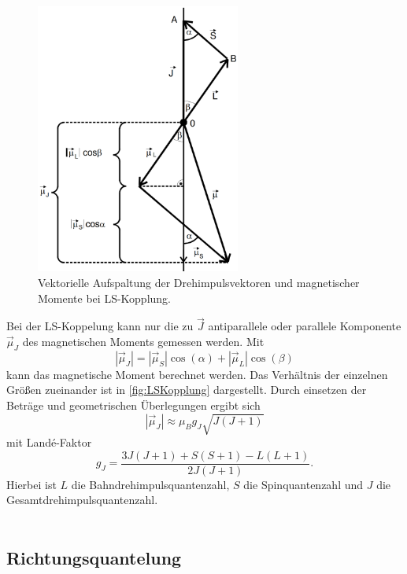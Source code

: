 \begin{figure}[H]
    \centering
    \includegraphics[width=0.6\textwidth]{img/LSKopplung.png}
    \caption{Vektorielle Aufspaltung der Drehimpulsvektoren und magnetischer Momente bei LS-Kopplung. \cite{V606}}
    \label{fig:LSKopplung}
\end{figure}

Bei der LS-Koppelung kann nur die zu $\vec{J}$ antiparallele oder parallele Komponente $\vec{μ}_J$ des magnetischen Moments gemessen werden.
Mit
\begin{equation*}
    |\vec{μ}_J| = |\vec{μ}_S| \cos(α) + |\vec{μ}_L| \cos(β)
\end{equation*}
kann das magnetische Moment berechnet werden.
Das Verhältnis der einzelnen Größen zueinander ist in \autoref{fig:LSKopplung} dargestellt.
Durch einsetzen der Beträge und geometrischen Überlegungen ergibt sich
\begin{equation*}
    |\vec{μ}_J| \approx μ_B g_J \sqrt{J(J+1)}
\end{equation*}
mit Landé-Faktor
\begin{equation}\label{eq:lande}
    g_J = \frac{3J(J+1) + S(S+1) - L(L+1)}{2J(J+1)}.
\end{equation}
Hierbei ist $L$ die Bahndrehimpulsquantenzahl, $S$ die Spinquantenzahl und $J$ die Gesamtdrehimpulsquantenzahl.
\\
\\
\subsection{Richtungsquantelung}

